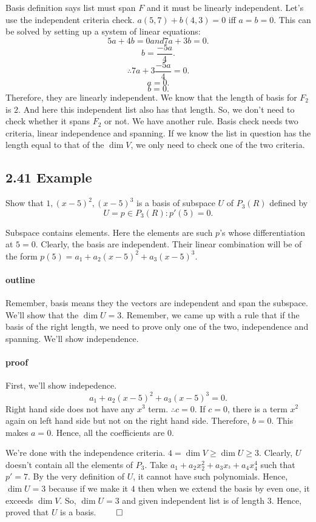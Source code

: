 \documentclass{report}
\begin{document}
Basis definition says list must span $F$ and it must be linearly independent. Let's use the independent criteria check. $a(5,7) + b(4,3) = 0$ iff $a = b = 0$. This can be solved by setting up a system of linear equations:
\[
5a + 4b = 0 and 7a + 3b = 0 
.\] 
\[
b = \frac{-5a}{4}
.\] 
\[
\therefore 7a + 3\frac{-5a}{4} = 0 
.\] 
\[
a = 0 
.\] 
\[
b = 0 
.\] 
Therefore, they are linearly independent. We know that the length of basis for $F_2$ is $2$. And here this independent list also has that length. So, we don't need to check whether it spans $F_2$ or not. We have another rule. Basis check needs two criteria, linear independence and spanning. If we know the list in question has the length equal to that of the $\dim V$, we only need to check one of the two criteria. 




\subsection*{2.41 Example}
Show that $1, (x-5)^2, (x-5)^3 $ is a basis of subspace $U$ of $P_3(R)$ defined by 
\[
	U = {p \in P_3(R): p'(5)=0} 
.\]

Subspace contains elements. Here the elements are such $p$'s whose differentiation at $5 = 0$. Clearly, the basis are independent. Their linear combination will be of the form $p(5) = a_1 +a_2 (x-5)^2 + a_3(x-5)^3$. 
\paragraph{outline} Remember, basis means they the vectors are independent and span the subspace.  We'll show that the $\dim U = 3$. Remember, we came up with a rule that if the basis of the right length, we need to prove only one of the two, independence and spanning. We'll show independence. 
\paragraph{proof} First, we'll show indepedence. 
\[
a_1 + a_2(x-5)^2 + a_3(x-5)^3 = 0 
.\] 
Right hand side does not have any $x^3$ term. $\therefore c = 0$. If $c=0$, there is a term $x^2$ again on left hand side but not on the right hand side. Therefore, $b = 0$. This makes $a=0$. Hence, all the coefficients are $0$. 

We're done with the independence criteria. $4 = \dim V \geq \dim U \geq 3$. Clearly, $U$ doesn't contain all the elements of $P_3$. Take $a_1 + a_2x_2^2 + a_3x_^3 + a_4x_4^4$ such that $p' = 7$. By the very definition of $U$, it cannot have such polynomials. Hence, $\dim U = 3$ because if we make it $4$ then when we extend the basis by even one, it exceeds $\dim V$. So, $\dim U = 3$ and given independent list is of length  $3$. Hence, proved that $U$ is a basis. $\qed$ 
\end{document}
